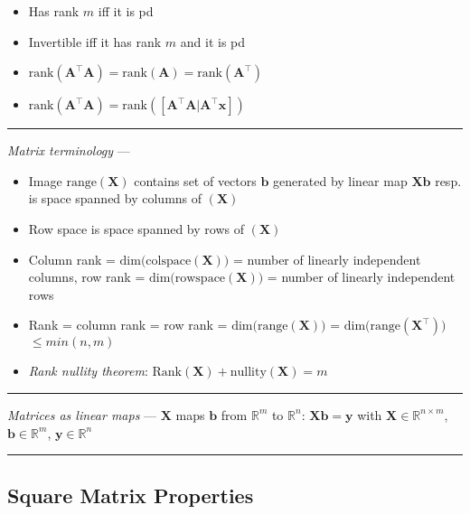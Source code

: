 \begin{multicols}{2}
\begin{itemize}
\begin{itemize}
        \item Has rank $m$ iff it is pd
        \item Invertible iff it has rank $m$ and it is pd
        \item $\textrm{rank}(\boldsymbol{A}^\intercal\boldsymbol{A}) = \textrm{rank}(\boldsymbol{A}) = \textrm{rank}(\boldsymbol{A}^\intercal)$
        \item $\textrm{rank}(\boldsymbol{A}^\intercal\boldsymbol{A}) = \textrm{rank}([\boldsymbol{A}^\intercal\boldsymbol{A} | \boldsymbol{A}^\intercal\boldsymbol{x}])$
    \end{itemize}
\end{itemize}
\end{multicols}

{\color{lightgray}\hrule height 0.001mm}

\emph{Matrix terminology} ---
\begin{itemize}
    \item Image $\textrm{range}(\boldsymbol{X})$ contains set of vectors $\boldsymbol{b}$ generated by linear map $\boldsymbol{X}\boldsymbol{b}$ resp. is space spanned by columns of $(\boldsymbol{X})$
    \item Row space is space spanned by rows of $(\boldsymbol{X})$ 
    \item Column rank = $\textrm{dim(colspace}(\boldsymbol{X}))$ = number of linearly independent columns, row rank = $\textrm{dim(rowspace}(\boldsymbol{X}))$ = number of linearly independent rows
    \item Rank = column rank = row rank = $\textrm{dim(range}(\boldsymbol{X}))$ = $\textrm{dim(range}(\boldsymbol{X}^\intercal))$ $\leq min(n,m)$
    \item \emph{Rank nullity theorem}: $\textrm{Rank}(\boldsymbol{X}) + \textrm{nullity}(\boldsymbol{X}) = m$
\end{itemize}

{\color{lightgray}\hrule height 0.001mm}

\emph{Matrices as linear maps} ---
$\boldsymbol{X}$ maps $\boldsymbol{b}$ from $\mathbb{R}^m$ to $\mathbb{R}^n$: $\boldsymbol{X}\boldsymbol{b} = \boldsymbol{y}$ with $\boldsymbol{X} \in \mathbb{R}^{n \times m}$, $\boldsymbol{b} \in \mathbb{R}^{m}$, $\boldsymbol{y} \in \mathbb{R}^{n}$

{\color{black}\hrule height 0.001mm}

\subsection*{Square Matrix Properties}

